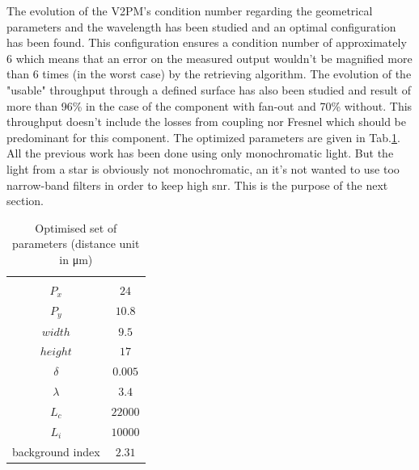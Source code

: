 The evolution of the V2PM's condition number regarding the geometrical parameters and the wavelength has been studied and an optimal configuration has been found. This configuration ensures a condition number of approximately 6 which means that an error on the measured output wouldn't be magnified more than 6 times (in the worst case) by the retrieving algorithm. The evolution of the "usable" throughput through a defined surface has also been studied and result of more than 96\% in the case of the component with fan-out and 70\% without. This throughput doesn't include the losses from coupling nor Fresnel which should be predominant for this component. The optimized parameters are given in Tab.\ref{tab:optimised_parameters}. All the previous work has been done using only monochromatic light. But the light from a star is obviously not monochromatic, an it's not wanted to use too narrow-band filters in order to keep high \gls{snr}. This is the purpose of the next section.


\begin{table}[htbp]
\begin{center}
\begin{tabular}{|c|c|}
\multicolumn{1}{c}{} &\multicolumn{1}{c}{} \\ \cline{1-2}
  $P_x$ & $\num{24}$ \\ \cline{1-2}
  $P_y$ & $\num{10,8}$\\\cline{1-2}
  $width$ & $\num{9,5}$ \\\cline{1-2}
  $height$ & $\num{17}$  \\\cline{1-2}
  $\delta$ & $\num{0,005}$  \\\cline{1-2}
  $\lambda$ & $\num{3,4}$ \\\cline{1-2}
  $L_c$ & $\num{22000}$  \\\cline{1-2}
  $L_i$ & $\num{10000}$  \\\cline{1-2}
  background index & $\num{2,31}$  \\\cline{1-2}
\end{tabular}\\
\end{center}
\caption{Optimised set of parameters (distance unit in \si{\micro\meter})}
\label{tab:optimised_parameters}
\end{table}

